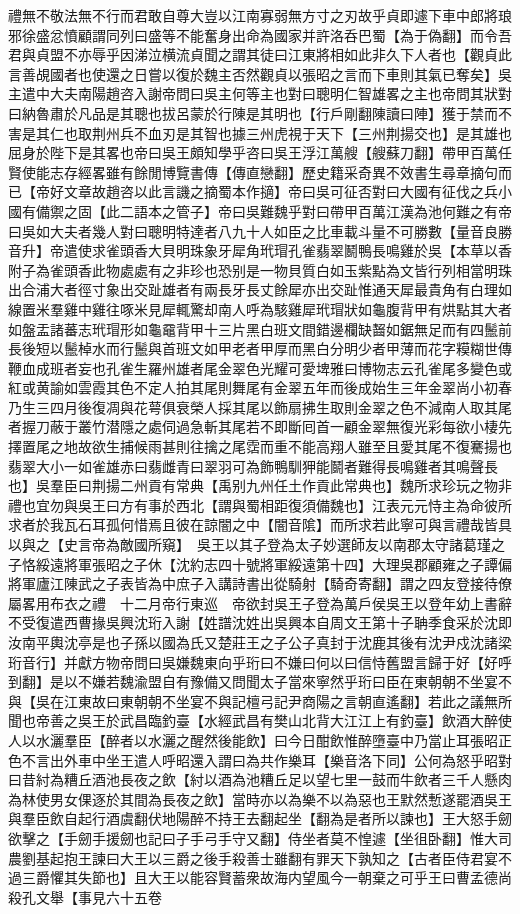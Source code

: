 禮無不敬法無不行而君敢自尊大豈以江南寡弱無方寸之刃故乎貞即遽下車中郎將琅邪徐盛忿憤顧謂同列曰盛等不能奮身出命為國家并許洛呑巴蜀【為于偽翻】而令吾君與貞盟不亦辱乎因涕泣横流貞聞之謂其徒曰江東將相如此非久下人者也【觀貞此言善覘國者也使還之日嘗以復於魏主否然觀貞以張昭之言而下車則其氣已奪矣】吳主遣中大夫南陽趙咨入謝帝問曰吳主何等主也對曰聰明仁智雄畧之主也帝問其狀對曰納魯肅於凡品是其聰也拔呂蒙於行陳是其明也【行戶剛翻陳讀曰陣】獲于禁而不害是其仁也取荆州兵不血刃是其智也據三州虎視于天下【三州荆揚交也】是其雄也屈身於陛下是其畧也帝曰吳王頗知學乎咨曰吳王浮江萬艘【艘蘇刀翻】帶甲百萬任賢使能志存經畧雖有餘閒博覽書傳【傳直戀翻】歷史籍采奇異不效書生尋章摘句而已【帝好文章故趙咨以此言譏之摘蜀本作擿】帝曰吳可征否對曰大國有征伐之兵小國有備禦之固【此二語本之管子】帝曰吳難魏乎對曰帶甲百萬江漢為池何難之有帝曰吳如大夫者幾人對曰聰明特達者八九十人如臣之比車載斗量不可勝數【量音良勝音升】帝遣使求雀頭香大貝明珠象牙犀角玳瑁孔雀翡翠鬭鴨長鳴雞於吳【本草以香附子為雀頭香此物處處有之非珍也恐别是一物貝質白如玉紫點為文皆行列相當明珠出合浦大者徑寸象出交趾雄者有兩長牙長丈餘犀亦出交趾惟通天犀最貴角有白理如線置米羣雞中雞往啄米見犀輒驚却南人呼為駭雞犀玳瑁狀如龜腹背甲有烘點其大者如盤盂諸蕃志玳瑁形如龜黿背甲十三片黑白班文間錯邊欄缺齧如鋸無足而有四鬛前長後短以鬛棹水而行鬛與首班文如甲老者甲厚而黑白分明少者甲薄而花字糢糊世傳鞭血成班者妄也孔雀生羅州雄者尾金翠色光耀可愛埤雅曰博物志云孔雀尾多變色或紅或黄諭如雲霞其色不定人拍其尾則舞尾有金翠五年而後成始生三年金翠尚小初春乃生三四月後復凋與花萼俱衰榮人採其尾以飾扇拂生取則金翠之色不減南人取其尾者握刀蔽于叢竹潜隱之處伺過急斬其尾若不即斷囘首一顧金翠無復光彩每欲小棲先擇置尾之地故欲生捕候雨甚則往擒之尾霑而重不能高翔人雖至且愛其尾不復騫揚也翡翠大小一如雀雄赤曰翡雌青曰翠羽可為飾鴨馴狎能鬬者難得長鳴雞者其鳴聲長也】吳羣臣曰荆揚二州貢有常典【禹别九州任土作貢此常典也】魏所求珍玩之物非禮也宜勿與吳王曰方有事於西北【謂與蜀相距復須備魏也】江表元元恃主為命彼所求者於我瓦石耳孤何惜焉且彼在諒闇之中【闇音隂】而所求若此寧可與言禮哉皆具以與之【史言帝為敵國所窺】　吳王以其子登為太子妙選師友以南郡太守諸葛瑾之子恪綏遠將軍張昭之子休【沈約志四十號將軍綏遠第十四】大理吳郡顧雍之子譚偏將軍廬江陳武之子表皆為中庶子入講詩書出從騎射【騎奇寄翻】謂之四友登接待僚屬畧用布衣之禮　十二月帝行東巡　帝欲封吳王子登為萬戶侯吳王以登年幼上書辭不受復遣西曹掾吳興沈珩入謝【姓譜沈姓出吳興本自周文王第十子聃季食采於沈即汝南平輿沈亭是也子孫以國為氏又楚莊王之子公子真封于沈鹿其後有沈尹戍沈諸梁珩音行】并獻方物帝問曰吳嫌魏東向乎珩曰不嫌曰何以曰信恃舊盟言歸于好【好呼到翻】是以不嫌若魏渝盟自有豫備又問聞太子當來寧然乎珩曰臣在東朝朝不坐宴不與【吳在江東故曰東朝朝不坐宴不與記檀弓記尹商陽之言朝直遙翻】若此之議無所聞也帝善之吳王於武昌臨釣臺【水經武昌有樊山北背大江江上有釣臺】飲酒大醉使人以水灑羣臣【醉者以水灑之醒然後能飲】曰今日酣飲惟醉墮臺中乃當止耳張昭正色不言出外車中坐王遣人呼昭還入謂曰為共作樂耳【樂音洛下同】公何為怒乎昭對曰昔紂為糟丘酒池長夜之飲【紂以酒為池糟丘足以望七里一鼓而牛飲者三千人懸肉為林使男女倮逐於其間為長夜之飲】當時亦以為樂不以為惡也王默然慙遂罷酒吳王與羣臣飲自起行酒虞翻伏地陽醉不持王去翻起坐【翻為是者所以諫也】王大怒手劒欲擊之【手劒手援劒也記曰子手弓手守又翻】侍坐者莫不惶遽【坐徂卧翻】惟大司農劉基起抱王諫曰大王以三爵之後手殺善士雖翻有罪天下孰知之【古者臣侍君宴不過三爵懼其失節也】且大王以能容賢蓄衆故海内望風今一朝棄之可乎王曰曹孟德尚殺孔文舉【事見六十五卷